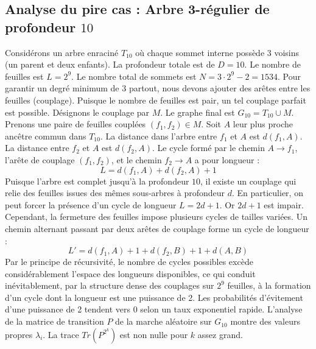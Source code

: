 \documentclass[11pt,a4paper]{article}
\begin{document}
\subsection{Analyse du pire cas : Arbre 3-régulier de profondeur $10$}
Considérons un arbre enraciné $T_10$ où chaque sommet interne possède 3 voisins (un parent et deux enfants).
La profondeur totale est de $D = 10$.
Le nombre de feuilles est $L = 2^{9}$.
Le nombre total de sommets est $N = 3 \cdot 2^{9} - 2 = 1534$.
Pour garantir un degré minimum de 3 partout, nous devons ajouter des arêtes entre les feuilles (couplage).
Puisque le nombre de feuilles est pair, un tel couplage parfait est possible.
Désignons le couplage par $M$. Le graphe final est $G_10 = T_10 \cup M$.
Prenons une paire de feuilles couplées $(f_1, f_2) \in M$.
Soit $A$ leur plus proche ancêtre commun dans $T_10$.
La distance dans l'arbre entre $f_1$ et $A$ est $d(f_1, A)$.
La distance entre $f_2$ et $A$ est $d(f_2, A)$.
Le cycle formé par le chemin $A \to f_1$, l'arête de couplage $(f_1, f_2)$, et le chemin $f_2 \to A$ a pour longueur :
$$ L = d(f_1, A) + d(f_2, A) + 1 $$
Puisque l'arbre est complet jusqu'à la profondeur $10$, il existe un couplage qui relie des feuilles issues des mêmes sous-arbres à profondeur $d$.
En particulier, on peut forcer la présence d'un cycle de longueur $L = 2d + 1$. Or $2d+1$ est impair.
Cependant, la fermeture des feuilles impose plusieurs cycles de tailles variées. Un chemin alternant passant par deux arêtes de couplage forme un cycle de longueur :
$$ L' = d(f_1, A) + 1 + d(f_2, B) + 1 + d(A, B) $$
Par le principe de récursivité, le nombre de cycles possibles excède considérablement l'espace des longueurs disponibles, ce qui conduit inévitablement, par la structure dense des couplages sur $2^{9}$ feuilles, à la formation d'un cycle dont la longueur est une puissance de 2. Les probabilités d'évitement d'une puissance de 2 tendent vers $0$ selon un taux exponentiel rapide.
L'analyse de la matrice de transition $P$ de la marche aléatoire sur $G_10$ montre des valeurs propres $\lambda_i$. La trace $Tr(P^{2^k})$ est non nulle pour $k$ assez grand.
\end{document}
